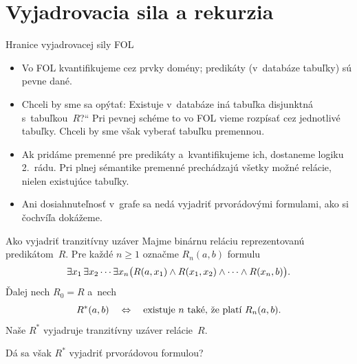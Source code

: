 \documentclass[12pt]{beamer}
\providecommand{\uv}[1]{\quotedblbase #1\textquotedblleft}
\newcommand{\quant}[2]{\mathop{#1#2\/}\nolimits}
\newcommand{\E}{\quant\exists}
\newcommand{\Equiv}{\mathrel{\Leftrightarrow}}
\begin{document}
\section{Vyjadrovacia sila a rekurzia}
\begin{frame}{Hranice vyjadrovacej sily FOL}
  \begin{itemize}
    \item Vo FOL kvantifikujeme cez prvky domény;
      predikáty (v~databáze tabuľky) sú pevne dané.
    \item Chceli by sme sa opýtať: \uv{Existuje v~databáze iná
      tabuľka disjunktná s~tabuľkou~$R$?}
      Pri pevnej schéme to vo FOL vieme rozpísať cez jednotlivé tabuľky.
      Chceli by sme však vyberať tabuľku premennou.
    \item Ak pridáme premenné pre predikáty a~kvantifikujeme ich,
      dostaneme \alert{logiku 2.~rádu}. Pri plnej sémantike premenné
      prechádzajú všetky možné relácie, nielen existujúce tabuľky.
    \item Ani dosiahnuteľnosť v~grafe sa nedá vyjadriť prvorádovými formulami, ako si čochvíľa dokážeme.

  \end{itemize}
\end{frame}

\begin{frame}{Ako vyjadriť tranzitívny uzáver}
  Majme binárnu reláciu reprezentovanú predikátom~$R$.
  Pre každé $n\ge 1$ označme $R_n(a,b)$ formulu
  \[
    \E{x_1}\E{x_2}\cdots\E{x_n}
    \bigl(R(a,x_1)\land R(x_1,x_2)\land\dots\land R(x_n,b)\bigr).
  \]
  Ďalej nech $R_0=R$ a~nech
  \[
    R^*(a,b)\quad\Equiv\quad
      \hbox{existuje~$n$ také, že platí $R_n(a,b)$}.
  \]
  Naše $R^*$ vyjadruje tranzitívny uzáver relácie~$R$.

  \bigskip
  Dá sa však $R^*$ vyjadriť prvorádovou formulou?
\end{frame}
\end{document}
